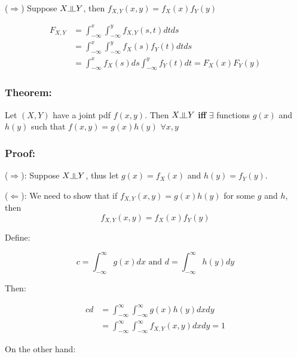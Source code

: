 \documentclass{article}
\newcommand{\indep}{\rotatebox[origin=c]{90}{$\models$}}
\begin{document}
\noindent ($\Rightarrow$) Suppose $X \indep Y$, then $f_{X,Y} (x,y) = f_X(x) f_Y(y)$

\begin{equation*}
    \begin{split}
        F_{X,Y} &= \int_{-\infty}^x \int_{-\infty}^y f_{X,Y}(s,t)dt ds\\
            &= \int_{-\infty}^x \int_{-\infty}^y f_X(s) f_Y(t) dt ds\\
            &= \int_{-\infty}^x f_X(s) ds \int_{-\infty}^y f_Y(t) dt = F_X(x) F_Y(y)
    \end{split}
\end{equation*}

\subsubsection*{Theorem:}

Let $(X,Y)$ have a joint pdf $f(x,y)$. Then $X \indep Y$ \textbf{iff} $\exists$ functions $g(x)$ and $h(y)$ such that $f(x,y)=g(x)h(y)$ $\forall x,y$

\subsubsection*{Proof:}

($\Rightarrow$): Suppose $X \indep Y$, thus let $g(x) = f_X(x)$ and $h(y) = f_Y(y)$.

\noindent ($\Leftarrow$): We need to show that if $f_{X,Y}(x,y) = g(x)h(y)$ for some $g$ and $h$, then
\begin{equation*}
    f_{X,Y}(x,y) = f_X(x) f_Y(y)
\end{equation*}

Define:

\begin{equation*}
    c = \int_{-\infty}^\infty g(x)dx \text{ and } d = \int_{-\infty}^\infty h(y) dy
\end{equation*}

Then:

\begin{equation*}
    \begin{split}
        cd &= \int_{-\infty}^\infty \int_{-\infty}^\infty g(x) h(y) dx dy\\
        &= \int_{-\infty}^\infty \int_{-\infty}^\infty f_{X,Y}(x,y) dx dy = 1
    \end{split}
\end{equation*}

On the other hand:
\end{document}
